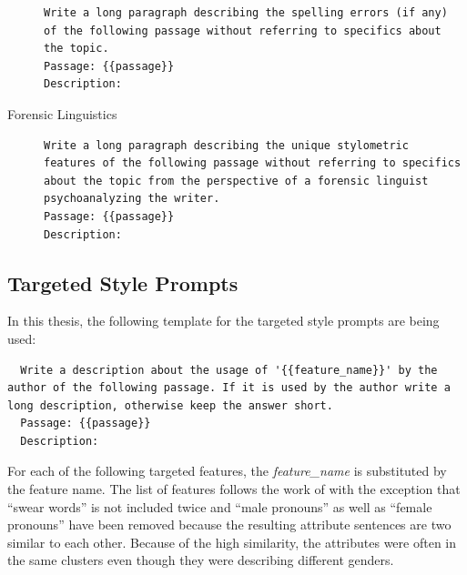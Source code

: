 \begin{description}
        \begin{minipage}{\linewidth}
          \begin{lstlisting}
Write a long paragraph describing the spelling errors (if any) of the following passage without referring to specifics about the topic.
Passage: {{passage}}
Description:
\end{lstlisting}
        \end{minipage}
  \item[Forensic Linguistics]\leavevmode \newline
        \begin{minipage}{\linewidth}
          \begin{lstlisting}
Write a long paragraph describing the unique stylometric features of the following passage without referring to specifics about the topic from the perspective of a forensic linguist psychoanalyzing the writer.
Passage: {{passage}}
Description:
\end{lstlisting}
        \end{minipage}
\end{description}

\subsection{Targeted Style Prompts}
\label{sec:appendix:targetPrompts}

In this thesis, the following template for the targeted style prompts are being used:
\begin{lstlisting}
  Write a description about the usage of '{{feature_name}}' by the author of the following passage. If it is used by the author write a long description, otherwise keep the answer short.
  Passage: {{passage}}
  Description:
\end{lstlisting}

For each of the following targeted features, the \textit{feature\_name} is substituted by the feature name. The list of features follows the work of \citet{patelLearningInterpretableStyle2023} with the exception that \enquote{swear words} is not included twice and \enquote{male pronouns} as well as \enquote{female pronouns} have been removed because the resulting attribute sentences are two similar to each other. Because of the high similarity, the attributes were often in the same clusters even though they were describing different genders.

